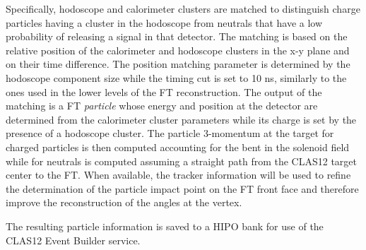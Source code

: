 Specifically, hodoscope and calorimeter clusters are matched to distinguish charge particles having a cluster in the hodoscope from neutrals that have a low probability of releasing a signal in that detector. The matching is based on the relative position of the calorimeter and hodoscope clusters in the x-y plane and on their time difference. The position matching parameter is determined by the hodoscope component size while the timing cut is set to 10 ns, similarly to the ones used in the lower levels of the FT reconstruction. The output of the matching is a FT {\it particle} whose energy and position at the detector are determined from the calorimeter cluster parameters while its charge is set by the presence of a hodoscope cluster. The particle 3-momentum at the target for charged particles is then computed accounting for the bent in the solenoid field while for neutrals is computed assuming a straight path from the CLAS12 target center to the FT. When available, the tracker information will be used to refine the determination of the particle impact point on the FT front face and therefore improve the reconstruction of the angles at the vertex.

The resulting particle information is saved to a HIPO bank for use of the CLAS12 Event Builder service.
